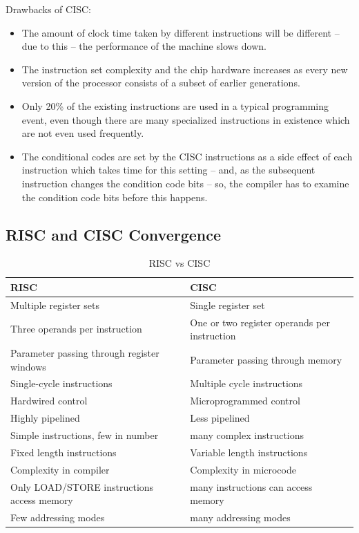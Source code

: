 \documentclass[doc,natbib,12pt]{apa6}
\begin{document}
	Drawbacks of CISC: \citep{elprocus}
	\begin{itemize}
		\item The amount of clock time taken by different instructions will be different – due to this – the performance of the machine slows down.
		\item The instruction set complexity and the chip hardware increases as every new version of the processor consists of a subset of earlier generations.
		\item Only 20\% of the existing instructions are used in a typical programming event, even though there are many specialized instructions in existence which are not even used frequently.
		\item The conditional codes are set by the CISC instructions as a side effect of each instruction which takes time for this setting – and, as the subsequent instruction changes the condition code bits – so, the compiler has to examine the condition code bits before this happens.
	\end{itemize}
	
	\subsection{RISC and CISC Convergence}
	
	\begin{table}[htpb]
		\centering
		\begin{tabular}{p{2in}|p{2in}}
			RISC & CISC \\\hline
			Multiple register sets & Single register set \\
			Three operands per instruction & One or two register operands per instruction \\
			Parameter passing through register windows & Parameter passing through memory \\
			Single-cycle instructions & Multiple cycle instructions \\
			Hardwired control & Microprogrammed control \\
			Highly pipelined & Less pipelined \\
			Simple instructions, few in number & many complex instructions \\
			Fixed length instructions & Variable length instructions \\
			Complexity in compiler & Complexity in microcode \\
			Only LOAD/STORE instructions access memory & many instructions can access memory \\
			Few addressing modes & many addressing modes 
		\end{tabular}
		\caption{\label{tab:RISCvsCISC}RISC vs CISC \citep{Null2012}}
	\end{table}
	
\end{document}
